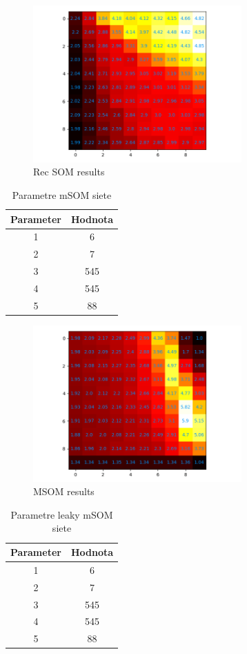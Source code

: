 \begin{figure}[H]
    \centering
    \includegraphics[width=8cm]{assets/recsom_abcd}
    \caption{Rec SOM results}
\end{figure}


\begin{table}[h!]
    \centering
    \begin{tabular}{|c|c|} 
     \hline
     Parameter & Hodnota \\ 
     \hline\hline
     1 & 6  \\ 
     \hline
     2 & 7   \\
     \hline
     3 & 545  \\
     \hline
     4 & 545  \\
     \hline
     5 & 88 \\  
     \hline
    \end{tabular}
    \caption{Parametre mSOM siete}
    \label{table:2}
\end{table}

\begin{figure}[H]
    \centering
    \includegraphics[width=8cm]{assets/msom_abcd}
    \caption{MSOM results}
\end{figure}


\begin{table}[h!]
    \centering
    \begin{tabular}{|c|c|} 
     \hline
     Parameter & Hodnota \\ 
     \hline\hline
     1 & 6  \\ 
     \hline
     2 & 7   \\
     \hline
     3 & 545  \\
     \hline
     4 & 545  \\
     \hline
     5 & 88 \\  
     \hline
    \end{tabular}
    \caption{Parametre leaky mSOM siete}
    \label{table:2}
\end{table}

